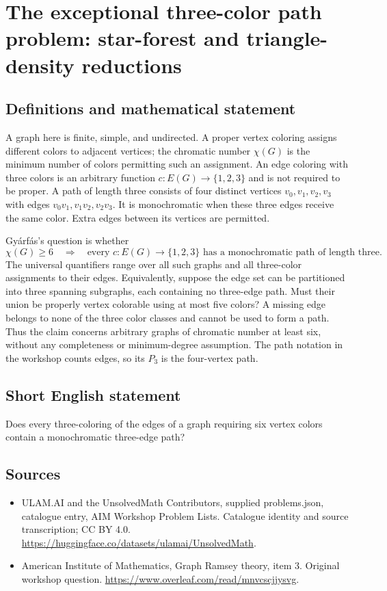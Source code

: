 \documentclass[11pt,a4paper]{article}
\begin{document}
\section*{The exceptional three-color path problem: star-forest and triangle-density reductions}\label{statement}

\subsection{Definitions and mathematical statement}
A graph here is finite, simple, and undirected. A proper vertex coloring
assigns different colors to adjacent vertices; the chromatic number
$\chi(G)$ is the minimum number of colors permitting such an assignment.
An edge coloring with three colors is an arbitrary function
$c:E(G)\to\{1,2,3\}$ and is not required to be proper.
A path of length three consists of four distinct vertices
$v_0,v_1,v_2,v_3$ with edges $v_0v_1,v_1v_2,v_2v_3$.
It is monochromatic when these three edges receive the same color.
Extra edges between its vertices are permitted.

Gy\'arf\'as's question is whether
\[
 \chi(G)\ge6\quad\Longrightarrow\quad
 \text{every }c:E(G)\to\{1,2,3\}
 \text{ has a monochromatic path of length three}.
\]
The universal quantifiers range over all such graphs and all three-color
assignments to their edges. Equivalently, suppose the edge set can be
partitioned into three spanning subgraphs, each containing no
three-edge path. Must their union be properly vertex colorable using
at most five colors? A missing edge belongs to none of the three color
classes and cannot be used to form a path. Thus the claim concerns
arbitrary graphs of chromatic number at least six, without any
completeness or minimum-degree assumption. The path notation in the
workshop counts edges, so its $P_3$ is the four-vertex path.
\subsection{Short English statement}
Does every three-coloring of the edges of a graph requiring six vertex colors contain a monochromatic three-edge path?
\subsection{Sources}
\begin{itemize}
\item[S1] ULAM.AI and the UnsolvedMath Contributors, supplied problems.json, catalogue entry, AIM Workshop Problem Lists. Catalogue identity and source transcription; CC BY 4.0.
\url{https://huggingface.co/datasets/ulamai/UnsolvedMath}.
\item[S2] American Institute of Mathematics, Graph Ramsey theory, item 3. Original workshop question.
\url{https://www.overleaf.com/read/mnvcscjjysvg}.
\end{itemize}
\end{document}
